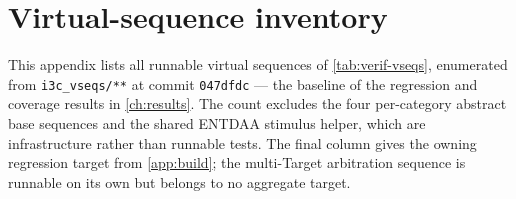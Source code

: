 \chapter{Virtual-sequence inventory}
\label{app:vseq-inventory}

This appendix lists all \RunnableVseqCount{} runnable virtual sequences of
\cref{tab:verif-vseqs}, enumerated from \texttt{i3c\_vseqs/**} at commit \texttt{047dfdc} ---
the baseline of the regression and coverage results in \cref{ch:results}. The count excludes
the four per-category abstract base sequences and the shared ENTDAA stimulus helper, which
are infrastructure rather than runnable tests. The final column gives the owning regression
target from \cref{app:build}; the multi-Target arbitration sequence is runnable on its own but
belongs to no aggregate target.

